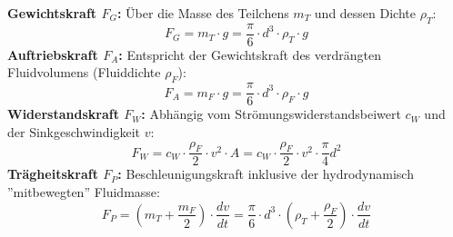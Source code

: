 \documentclass[a4paper,10pt,twoside]{article}
\begin{document}
    \textbf{Gewichtskraft $F_G$:} Über die Masse des Teilchens $m_T$ und dessen Dichte $\rho_T$:
    \begin{equation}
        F_G = m_T \cdot g = \frac{\pi}{6} \cdot d^3 \cdot \rho_T \cdot g
    \end{equation}
    \textbf{Auftriebskraft $F_A$:} Entspricht der Gewichtskraft des verdrängten Fluidvolumens (Fluiddichte $\rho_F$):
    \begin{equation}
        F_A = m_F \cdot g = \frac{\pi}{6} \cdot d^3 \cdot \rho_F \cdot g
    \end{equation}
   \textbf{Widerstandskraft $F_W$:} Abhängig vom Strömungswiderstandsbeiwert $c_W$ und der Sinkgeschwindigkeit $v$:
    \begin{equation}
        F_W = c_W \cdot \frac{\rho_F}{2} \cdot v^2 \cdot A = c_W \cdot \frac{\rho_F}{2} \cdot v^2 \cdot \frac{\pi}{4} d^2
    \end{equation}
\textbf{Trägheitskraft $F_P$:} Beschleunigungskraft inklusive der hydrodynamisch ''mitbewegten'' Fluidmasse:
    \begin{equation}
        F_P = \left(m_T + \frac{m_F}{2}\right) \cdot \frac{dv}{dt} = \frac{\pi}{6} \cdot d^3 \cdot \left(\rho_T + \frac{\rho_F}{2}\right) \cdot \frac{dv}{dt}
    \end{equation}
    
    




\end{document}
